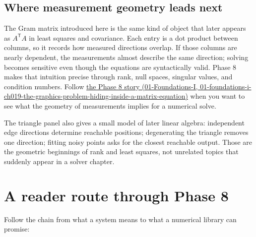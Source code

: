 \subsection{Where measurement geometry leads next}\label{02-foundations-ii-ch039-where-measurement-geometry-leads-next}

The Gram matrix introduced here is the same kind of object that later appears as \(A^\mathsf T A\) in least squares and covariance. Each entry is a dot product between columns, so it records how measured directions overlap. If those columns are nearly dependent, the measurements almost describe the same direction; solving becomes sensitive even though the equations are syntactically valid. Phase 8 makes that intuition precise through rank, null spaces, singular values, and condition numbers. Follow \href{../01-Foundations-I/main.pdf\#nameddest=01-foundations-i-ch019-the-graphics-problem-hiding-inside-a-matrix-equation}{the Phase 8 story (01-Foundations-I, 01-foundations-i-ch019-the-graphics-problem-hiding-inside-a-matrix-equation)} when you want to see what the geometry of measurements implies for a numerical solve.

The triangle panel also gives a small model of later linear algebra: independent edge directions determine reachable positions; degenerating the triangle removes one direction; fitting noisy points asks for the closest reachable output. Those are the geometric beginnings of rank and least squares, not unrelated topics that suddenly appear in a solver chapter.

\section{A reader route through Phase 8}\label{02-foundations-ii-ch039-a-reader-route-through-phase-8}

Follow the chain from what a system means to what a numerical library can promise:

